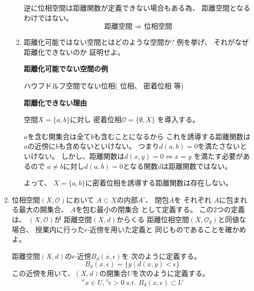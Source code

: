 \documentclass[12pt,b5paper]{ltjsarticle}
\begin{document}
\begin{enumerate}
\begin{enumerate}
            逆に位相空間は距離関数が定義できない場合もある為、
            距離空間となるわけではない。
            \begin{equation}
             \text{距離空間 } \Rightarrow \text{ 位相空間}
            \end{equation}


            \hrulefill

       \item
            距離化可能ではない空間とはどのような空間か?
            例を挙げ、
            それがなぜ距離化できないのか
            証明せよ。

            \dotfill

            \textbf{距離化可能でない空間の例}

            ハウフドルフ空間でない位相(
            位相、
            密着位相 等)

            \textbf{距離化できない理由}

            空間$X=\{a,b\}$に対し
            密着位相$\mathcal{O}=\{\emptyset,X\}$
            を導入する。

            $a$を含む開集合は全て$b$も含むことになるから
            これを誘導する距離関数は
            $a$の近傍に$b$も含めないといけない。
            つまり$d(a,b)=0$を満たさないといけない。
            しかし、距離関数は$d(x,y)=0 \Leftrightarrow x=y$
            を満たす必要があるので
            $a\ne b$に対し$d(a,b)=0$となる関数$d$は距離関数ではない。

            よって、
            $X=\{a,b\}$に密着位相を誘導する距離関数は存在しない。

            \hrulefill

      \end{enumerate}


 \item
      位相空間$(X,\mathcal{O})$において
      $A\subset X$の内部$A^{\circ}$、
      閉包$\overline{A}$を
      それぞれ
      $A$に包まれる最大の開集合、
      $A$を包む最小の閉集合
      として定義する。
      この2つの定義は、
      $(X,\mathcal{O})$が
      距離空間$(X,d)$からくる
      距離位相空間$(X,\mathcal{O}_{d})$と同値な場合、
      授業内に行った$\epsilon$-近傍を用いた定義と
      同じものであることを確かめよ。

      \dotfill

      距離空間$(X,d)$の$\epsilon$-近傍$B_{d}(x,\epsilon)$を
      次のように定義する。
      \begin{equation}
       B_{d}(x,\epsilon)=\{y \mid d(x,y)<\epsilon\}
      \end{equation}
      この近傍を用いて、$(X,d)$の開集合$U$を次のように定義する。
      \begin{equation}
       {}^{\forall}x\in U, {}^{\exists}\epsilon>0
        \text{ s.t. }
        B_{d}(x,\epsilon) \subset U
        \label{def_openset}
      \end{equation}


\end{enumerate}
\end{document}

